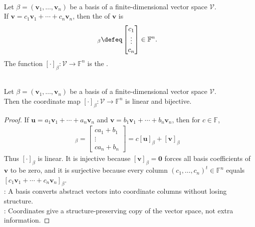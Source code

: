 \begin{definition} \\
Let $\beta=(\mathbf{v}_1,\ldots,\mathbf{v}_n)$ be a basis of a finite-dimensional vector space $\mathcal{V}$.\\
If $\mathbf{v}=c_1\mathbf{v}_1+\cdots+c_n\mathbf{v}_n$, then the  of $\mathbf{v}$ is
\begin{align}
[\mathbf{v}]_{\beta}\defeq
\begin{bmatrix}
c_1\\
\vdots\\
c_n
\end{bmatrix}
\in\mathbb{F}^n. \nonumber
\end{align}
The function $[\cdot]_{\beta}:\mathcal{V}\to\mathbb{F}^n$ is the .
\end{definition}

\begin{proposition} \label{prop:coordinate-map-isomorphism} \\
Let $\beta=(\mathbf{v}_1,\ldots,\mathbf{v}_n)$ be a basis of a finite-dimensional vector space $\mathcal{V}$.\\
Then the coordinate map $[\cdot]_{\beta}:\mathcal{V}\to\mathbb{F}^n$ is linear and bijective.
\begin{proof}
If $\mathbf{u}=a_1\mathbf{v}_1+\cdots+a_n\mathbf{v}_n$ and $\mathbf{v}=b_1\mathbf{v}_1+\cdots+b_n\mathbf{v}_n$, then for $c\in\mathbb{F}$,
\begin{align}
[c\mathbf{u}+\mathbf{v}]_{\beta} =
\begin{bmatrix}
ca_1+b_1\\
\vdots\\
ca_n+b_n
\end{bmatrix}
= c[\mathbf{u}]_{\beta}+[\mathbf{v}]_{\beta} \nonumber
\end{align}
Thus $[\cdot]_{\beta}$ is linear. It is injective because $[\mathbf{v}]_{\beta}=\mathbf{0}$ forces all basis coefficients of $\mathbf{v}$ to be zero, and it is surjective because every column $(c_1,\ldots,c_n)^t\in\mathbb{F}^n$ equals $[c_1\mathbf{v}_1+\cdots+c_n\mathbf{v}_n]_{\beta}$.\\
: A basis converts abstract vectors into coordinate columns without losing structure.\\
: Coordinates give a structure-preserving copy of the vector space, not extra information.
\end{proof}
\end{proposition}

